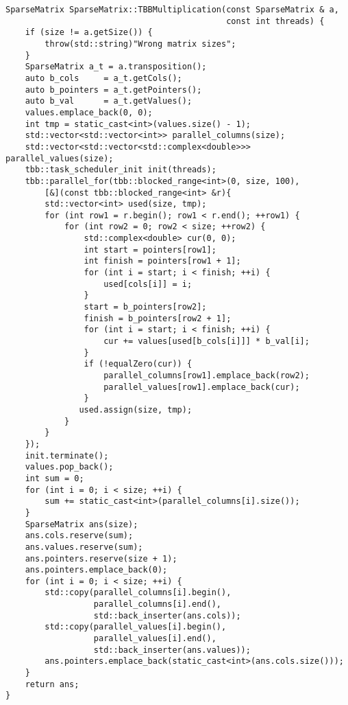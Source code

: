 \documentclass{report}
\begin{document}
\begin{lstlisting}
SparseMatrix SparseMatrix::TBBMultiplication(const SparseMatrix & a,
                                             const int threads) {
    if (size != a.getSize()) {
        throw(std::string)"Wrong matrix sizes";
    }
    SparseMatrix a_t = a.transposition();
    auto b_cols     = a_t.getCols();
    auto b_pointers = a_t.getPointers();
    auto b_val      = a_t.getValues();
    values.emplace_back(0, 0);
    int tmp = static_cast<int>(values.size() - 1);
    std::vector<std::vector<int>> parallel_columns(size);
    std::vector<std::vector<std::complex<double>>> parallel_values(size);
    tbb::task_scheduler_init init(threads);
    tbb::parallel_for(tbb::blocked_range<int>(0, size, 100),
        [&](const tbb::blocked_range<int> &r){
        std::vector<int> used(size, tmp);
        for (int row1 = r.begin(); row1 < r.end(); ++row1) {
            for (int row2 = 0; row2 < size; ++row2) {
                std::complex<double> cur(0, 0);
                int start = pointers[row1];
                int finish = pointers[row1 + 1];
                for (int i = start; i < finish; ++i) {
                    used[cols[i]] = i;
                }
                start = b_pointers[row2];
                finish = b_pointers[row2 + 1];
                for (int i = start; i < finish; ++i) {
                    cur += values[used[b_cols[i]]] * b_val[i];
                }
                if (!equalZero(cur)) {
                    parallel_columns[row1].emplace_back(row2);
                    parallel_values[row1].emplace_back(cur);
                }
               used.assign(size, tmp);
            }
        }
    });
    init.terminate();
    values.pop_back();
    int sum = 0;
    for (int i = 0; i < size; ++i) {
        sum += static_cast<int>(parallel_columns[i].size());
    }
    SparseMatrix ans(size);
    ans.cols.reserve(sum);
    ans.values.reserve(sum);
    ans.pointers.reserve(size + 1);
    ans.pointers.emplace_back(0);
    for (int i = 0; i < size; ++i) {
        std::copy(parallel_columns[i].begin(),
                  parallel_columns[i].end(),
                  std::back_inserter(ans.cols));
        std::copy(parallel_values[i].begin(),
                  parallel_values[i].end(),
                  std::back_inserter(ans.values));
        ans.pointers.emplace_back(static_cast<int>(ans.cols.size()));
    }
    return ans;
}


\end{lstlisting}
\end{document}
